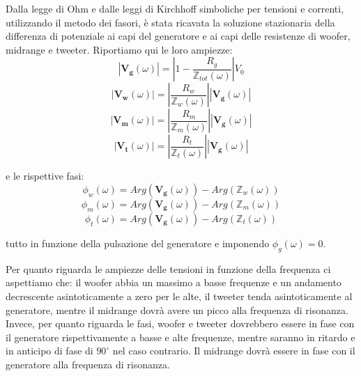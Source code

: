 \documentclass[12pt,italian]{article}
\begin{document}
Dalla legge di Ohm e dalle leggi di Kirchhoff simboliche per tensioni e
correnti, utilizzando il metodo dei fasori, è stata ricavata la soluzione
stazionaria della differenza di potenziale ai capi del generatore e ai capi
delle resistenze di woofer, midrange e tweeter. Riportiamo qui le loro ampiezze:
\begin{equation}
	\left| \mathbf{V_{g}}(\omega) \right| = \left| 1 - \frac{R_g}
	{\mathbb{Z}_{tot}(\omega)}\right| V_{0}
	\label{eq:Vg}
\end{equation}
\begin{equation}
	\left| \mathbf{V_{w}}(\omega) \right| = \left| \frac{R_{w}}
	{\mathbb{Z}_{w}(\omega)}\right|\left| \mathbf{V_{g}}(\omega) \right|
	\label{eq:Vw}
\end{equation}
\begin{equation}
	\left| \mathbf{V_{m}}(\omega) \right| = \left| \frac{R_{m}}
	{\mathbb{Z}_{m}(\omega)}\right|\left| \mathbf{V_{g}}(\omega) \right|
	\label{eq:Vm}
\end{equation}
\begin{equation}
	\left| \mathbf{V_{t}}(\omega) \right| = \left| \frac{R_{t}}
	{\mathbb{Z}_{t}(\omega)}\right|\left| \mathbf{V_{g}}(\omega) \right|
	\label{eq:Vt}
\end{equation}

\noindent
e le rispettive fasi:
\begin{equation*}
	\phi_{w}(\omega) = Arg(\mathbf{V_{g}}(\omega)) - Arg(\mathbb{Z}_{w}(\omega))
\end{equation*}
\begin{equation*}
	\phi_{m}(\omega) = Arg(\mathbf{V_{g}}(\omega)) - Arg(\mathbb{Z}_{m}(\omega))
\end{equation*}
\begin{equation*}
	\phi_{t}(\omega) =  Arg(\mathbf{V_{g}}(\omega)) - Arg(\mathbb{Z}_{t}(\omega))
\end{equation*}

\noindent
tutto in funzione della pulsazione del generatore e imponendo $\phi_g (\omega) = 0$.

Per quanto riguarda le ampiezze delle tensioni in funzione della frequenza ci
aspettiamo che: il woofer abbia un massimo a basse frequenze e un andamento
decrescente asintoticamente a zero per le alte, il tweeter tenda
asintoticamente al generatore, mentre il midrange dovrà avere un picco alla
frequenza di risonanza. Invece, per quanto riguarda le fasi, woofer e tweeter
dovrebbero essere in fase con il generatore rispettivamente a basse e alte
frequenze, mentre saranno in ritardo e in anticipo di fase di $90^\circ$ nel
caso contrario. Il midrange dovrà essere in fase con il generatore alla
frequenza di risonanza.
\end{document}
